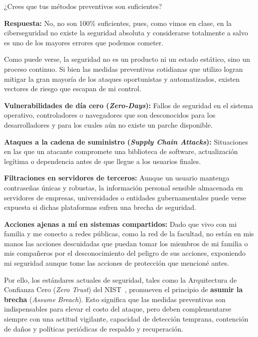 ¿Crees que tus métodos preventivos son suficientes?

\textbf{Respuesta:}
No, no son 100\% suficientes, pues, como vimos en clase, en la ciberseguridad no existe la seguridad absoluta y considerarse totalmente a salvo es uno de los mayores errores que podemos cometer.

Como puede verse, la seguridad no es un producto ni un estado estático, sino un proceso continuo. Si bien las medidas preventivas cotidianas que utilizo logran mitigar la gran mayoría de los ataques oportunistas y automatizados, existen vectores de riesgo que escapan de mi control.

\begin{itemizeColor}
    \item \textbf{Vulnerabilidades de día cero (\textit{Zero-Days}):} Fallos de seguridad en el sistema operativo, controladores o navegadores que son desconocidos para los desarrolladores y para los cuales aún no existe un parche disponible.
    \item \textbf{Ataques a la cadena de suministro (\textit{Supply Chain Attacks}):} Situaciones en las que un atacante compromete una biblioteca de software, actualización legítima o dependencia antes de que llegue a los usuarios finales.
    \item \textbf{Filtraciones en servidores de terceros:} Aunque un usuario mantenga contraseñas únicas y robustas, la información personal sensible almacenada en servidores de empresas, universidades o entidades gubernamentales puede verse expuesta si dichas plataformas sufren una brecha de seguridad.
    \item \textbf{Acciones ajenas a mí en sistemas compartidos:} Dado que vivo con mi familia y me conecto a redes públicas, como la red de la facultad, no están en mis manos las acciones descuidadas que puedan tomar los miembros de mi familia o mis compañeros por el desconocimiento del peligro de sus acciones, exponiendo mi seguridad aunque tome las acciones de protección que mencioné antes.
\end{itemizeColor}

Por ello, los estándares actuales de seguridad, tales como la Arquitectura de Confianza Cero (\textit{Zero Trust}) del NIST~\cite{nist_zero_trust}, promueven el principio de \textbf{asumir la brecha} (\textit{Assume Breach}). Esto significa que las medidas preventivas son indispensables para elevar el costo del ataque, pero deben complementarse siempre con una actitud vigilante, capacidad de detección temprana, contención de daños y políticas periódicas de respaldo y recuperación.

